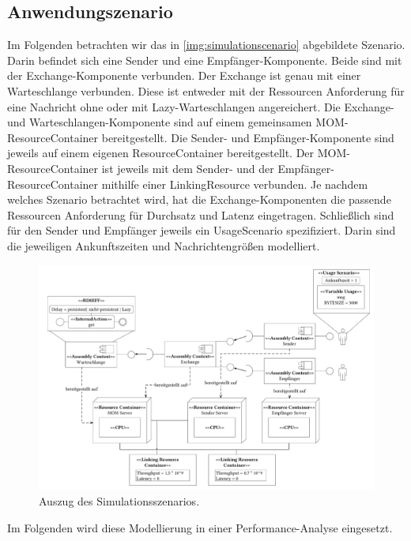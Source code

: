 \subsection{Anwendungszenario}
Im Folgenden betrachten wir das in \autoref{img:simulationscenario} abgebildete Szenario. Darin befindet sich eine Sender und eine Empfänger-Komponente. Beide sind mit der Exchange-Komponente verbunden. Der Exchange ist genau mit einer Warteschlange verbunden. Diese ist entweder mit der Ressourcen Anforderung für eine Nachricht ohne oder mit Lazy-Warteschlangen angereichert. Die Exchange- und Warteschlangen-Komponente sind auf einem gemeinsamen MOM-ResourceContainer bereitgestellt. Die Sender- und Empfänger-Komponente sind jeweils auf einem eigenen ResourceContainer bereitgestellt. Der MOM-ResourceContainer ist jeweils mit dem Sender- und der Empfänger-ResourceContainer mithilfe einer LinkingResource verbunden. Je nachdem welches Szenario betrachtet wird, hat die Exchange-Komponenten die passende Ressourcen Anforderung für Durchsatz und Latenz eingetragen. Schließlich sind für den Sender und Empfänger jeweils ein UsageScenario spezifiziert. Darin sind die jeweiligen Ankunftszeiten und Nachrichtengrößen modelliert.
\begin{figure}
\center
  \includegraphics[width=1.35\textwidth, angle=90]{images/modelling/modelingSimulationSzenario.pdf}
  \caption{Auszug des Simulationsszenarios.}
  \label{img:simulationscenario}
\end{figure}
Im Folgenden wird diese Modellierung in einer Performance-Analyse eingesetzt.


